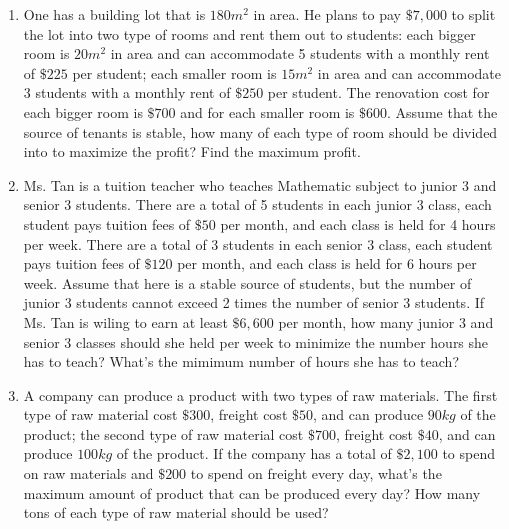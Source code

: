 \documentclass{report}
\begin{document}
\begin{multicols}{2}
\begin{enumerate}
        \item One has a building lot that is $180 m^2$ in area. He plans to pay $\$7,000$ to
              split the lot into two type of rooms and rent them out to students: each bigger
              room is $20 m^2$ in area and can accommodate 5 students with a monthly rent of
              $\$225$ per student; each smaller room is $15 m^2$ in area and can accommodate
              3 students with a monthly rent of $\$250$ per student. The renovation cost for
              each bigger room is $\$700$ and for each smaller room is $\$600$. Assume that
              the source of tenants is stable, how many of each type of room should be
              divided into to maximize the profit? Find the maximum profit.

        \item Ms. Tan is a tuition teacher who teaches Mathematic subject to junior 3 and
              senior 3 students. There are a total of 5 students in each junior 3 class, each
              student pays tuition fees of $\$50$ per month, and each class is held for 4
              hours per week. There are a total of 3 students in each senior 3 class, each
              student pays tuition fees of $\$120$ per month, and each class is held for 6
              hours per week. Assume that here is a stable source of students, but the number
              of junior 3 students cannot exceed 2 times the number of senior 3 students. If
              Ms. Tan is wiling to earn at least $\$6,600$ per month, how many junior 3 and
              senior 3 classes should she held per week to minimize the number hours she has
              to teach? What's the mimimum number of hours she has to teach?

        \item A company can produce a product with two types of raw materials. The first type
              of raw material cost $\$300$, freight cost $\$50$, and can produce $90kg$ of
              the product; the second type of raw material cost $\$700$, freight cost $\$40$,
              and can produce $100kg$ of the product. If the company has a total of $\$2,100$
              to spend on raw materials and $\$200$ to spend on freight every day, what's the
              maximum amount of product that can be produced every day? How many tons of each
              type of raw material should be used?


\end{enumerate}
\end{multicols}
\end{document}
